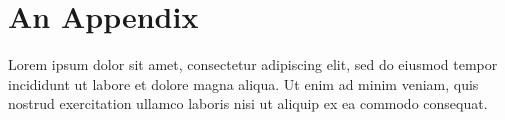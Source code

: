 \documentclass[a4, english]{article}
\begin{document}
\printbibliography

\newpage \appendix
\section{An Appendix}
Lorem ipsum dolor sit amet, consectetur adipiscing elit, sed do eiusmod tempor
incididunt ut labore et dolore magna aliqua. Ut enim ad minim veniam, quis
nostrud exercitation ullamco laboris nisi ut aliquip ex ea commodo consequat.
\end{document}
